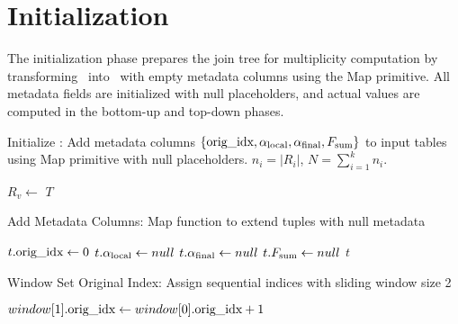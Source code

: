 \section{Initialization}
\label{sec:initialization}

The initialization phase prepares the join tree for multiplicity computation by transforming \ into \augmentedtables\ with empty metadata columns using the Map primitive. All metadata fields are initialized with null placeholders, and actual values are computed in the bottom-up and top-down phases.

\begin{algorithm}[H]
\caption{Initialize \augmentedtables: Add metadata columns $\{\text{orig\_idx}, \alpha_{\text{local}}, \alpha_{\text{final}}, F_{\text{sum}}\}$ to input tables using Map primitive with null placeholders. $n_i = |R_i|$, $N = \sum_{i=1}^{k} n_i$.}
\label{alg:initialize}
\begin{algorithmic}[1]
        \State $R_v \leftarrow$ 
        \State {}
    \EndFor
    \State \Return $T$\EndFunction
\end{algorithmic}
\end{algorithm}

\begin{algorithm}[H]
\caption{Add Metadata Columns: Map function to extend tuples with null metadata}
\label{alg:add-metadata}
\begin{algorithmic}[1]
    \State $t.\text{orig\_idx} \leftarrow 0$
    \State $t.\alpha_{\text{local}} \leftarrow null$
    \State $t.\alpha_{\text{final}} \leftarrow null$
    \State $t.F_{\text{sum}} \leftarrow null$
    \State \Return $t$
\EndFunction
\end{algorithmic}
\end{algorithm}

\begin{algorithm}[H]
\caption{Window Set Original Index: Assign sequential indices with sliding window size 2}
\label{alg:window-set-orig-index}
\begin{algorithmic}[1]
    \State $window[1].\text{orig\_idx} \leftarrow window[0].\text{orig\_idx} + 1$
\EndFunction
\end{algorithmic}
\end{algorithm}

